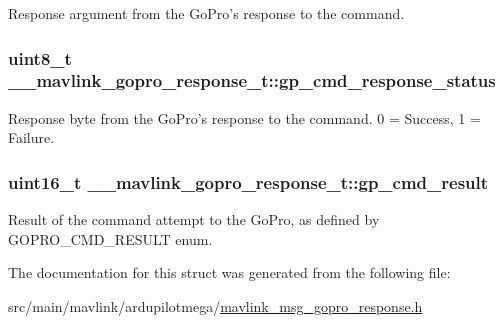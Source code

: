 Response argument from the Go\+Pro's response to the command. 

\hypertarget{struct____mavlink__gopro__response__t_aeea54927916f362ea820e82cad22c2bc}{
\subsubsection[{gp\+\_\+cmd\+\_\+response\+\_\+status}]{\setlength{\rightskip}{0pt plus 5cm}uint8\+\_\+t \+\_\+\+\_\+mavlink\+\_\+gopro\+\_\+response\+\_\+t\+::gp\+\_\+cmd\+\_\+response\+\_\+status}}\label{struct____mavlink__gopro__response__t_aeea54927916f362ea820e82cad22c2bc}


Response byte from the Go\+Pro's response to the command. 0 = Success, 1 = Failure. 

\hypertarget{struct____mavlink__gopro__response__t_aae5922dbdcb3b1f85036aa9392e69dba}{
\subsubsection[{gp\+\_\+cmd\+\_\+result}]{\setlength{\rightskip}{0pt plus 5cm}uint16\+\_\+t \+\_\+\+\_\+mavlink\+\_\+gopro\+\_\+response\+\_\+t\+::gp\+\_\+cmd\+\_\+result}}\label{struct____mavlink__gopro__response__t_aae5922dbdcb3b1f85036aa9392e69dba}


Result of the command attempt to the Go\+Pro, as defined by G\+O\+P\+R\+O\+\_\+\+C\+M\+D\+\_\+\+R\+E\+S\+U\+L\+T enum. 



The documentation for this struct was generated from the following file\+:\begin{DoxyCompactItemize}
\item 
src/main/mavlink/ardupilotmega/\hyperlink{mavlink__msg__gopro__response_8h}{mavlink\+\_\+msg\+\_\+gopro\+\_\+response.\+h}\end{DoxyCompactItemize}
